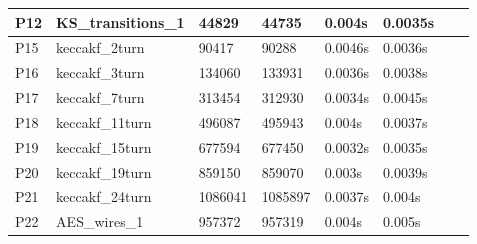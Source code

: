 \documentclass[pagesize, english, fontsize=10pt, DIV=25]{scrartcl}
\begin{document}
\begin{table}[]
{\begin{tabular}{|l|l|l|l|l|l|l|l|}
P12                              & KS\_transitions\_1                         & 44829                 & 44735                 & 0.004s           & 0.0035s          &                  &                \\ \hline
P15                              & keccakf\_2turn                             & 90417                 & 90288                 & 0.0046s          & 0.0036s          &                  &                \\ \hline
P16                              & keccakf\_3turn                             & 134060                & 133931                & 0.0036s          & 0.0038s          &                  &                \\ \hline
P17                              & keccakf\_7turn                             & 313454                & 312930                & 0.0034s          & 0.0045s          &                  &                \\ \hline
P18                              & keccakf\_11turn                            & 496087                & 495943                & 0.004s           & 0.0037s          &                  &                \\ \hline
P19                              & keccakf\_15turn                            & 677594                & 677450                & 0.0032s          & 0.0035s          &                  &                \\ \hline
P20                              & keccakf\_19turn                            & 859150                & 859070                & 0.003s           & 0.0039s          &                  &                \\ \hline
P21                              & keccakf\_24turn                            & 1086041               & 1085897               & 0.0037s          & 0.004s           &                  &                \\ \hline
P22                              & AES\_wires\_1                              & 957372                & 957319                & 0.004s           & 0.005s           &                  &                \\ \hline
\end{tabular}
 }              
\end{table}
\end{document}
